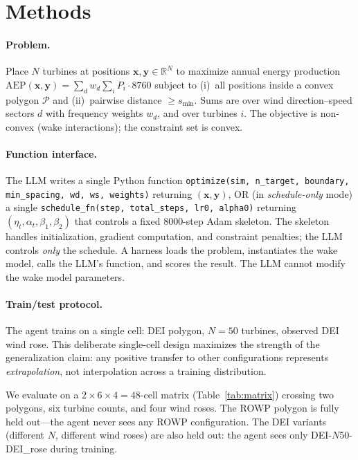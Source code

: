\section{Methods}
\label{sec:methods}

\paragraph{Problem.}
Place $N$ turbines at positions $\mathbf{x}, \mathbf{y} \in
\mathbb{R}^N$ to maximize annual energy production
$\text{AEP}(\mathbf{x}, \mathbf{y}) = \sum_{d} w_d \sum_{i} P_i \cdot
8760$ subject to (i)~all positions inside a convex polygon
$\mathcal{P}$ and (ii)~pairwise distance $\geq s_{\min}$. Sums are
over wind direction--speed sectors $d$ with frequency weights
$w_d$, and over turbines $i$. The objective is non-convex (wake
interactions); the constraint set is convex.

\paragraph{Function interface.}
The LLM writes a single Python function
\texttt{optimize(sim, n\_target, boundary, min\_spacing, wd, ws,
weights)} returning $(\mathbf{x}, \mathbf{y})$, OR (in
\emph{schedule-only} mode) a single
\texttt{schedule\_fn(step, total\_steps, lr0, alpha0)} returning
$(\eta_t, \alpha_t, \beta_1, \beta_2)$ that controls a fixed
8000-step Adam skeleton. The skeleton handles initialization,
gradient computation, and constraint penalties; the LLM controls
\emph{only} the schedule. A harness loads the problem, instantiates
the wake model, calls the LLM's function, and scores the result.
The LLM cannot modify the wake model parameters.

\paragraph{Train/test protocol.}
The agent trains on a single cell: DEI polygon, $N\!=\!50$
turbines, observed DEI wind rose. This deliberate single-cell
design maximizes the strength of the generalization claim: any
positive transfer to other configurations represents
\emph{extrapolation}, not interpolation across a training
distribution.

We evaluate on a $2 \times 6 \times 4 = 48$-cell matrix
(Table~\ref{tab:matrix}) crossing two polygons, six turbine
counts, and four wind roses. The ROWP polygon is fully held
out---the agent never sees any ROWP configuration. The DEI
variants (different $N$, different wind roses) are also held out:
the agent sees only DEI-$N\!$50-DEI\_rose during training.

